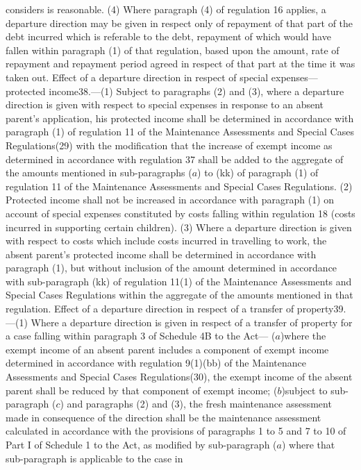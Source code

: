 \documentclass[a4paper]{article}
\begin{document}
considers is reasonable.
(4) Where paragraph (4) of regulation 16 applies, a departure direction may be
given in respect only of repayment of that part of the debt incurred which is
referable to the debt, repayment of which would have fallen within paragraph (1)
of that regulation, based upon the amount, rate of repayment and repayment
period agreed in respect of that part at the time it was taken out.
Effect of a departure direction in respect of special expenses—protected
income38.—(1) Subject to paragraphs (2) and (3), where a departure direction is
given with respect to special expenses in response to an absent parent’s
application, his protected income shall be determined in accordance with
paragraph (1) of regulation 11 of the Maintenance Assessments and Special Cases
Regulations(29) with the modification that the increase of exempt income as
determined in accordance with regulation 37 shall be added to the aggregate of
the amounts mentioned in sub-paragraphs ($a$) to (kk) of paragraph (1) of
regulation 11 of the Maintenance Assessments and Special Cases Regulations.
(2) Protected income shall not be increased in accordance with paragraph (1) on
account of special expenses constituted by costs falling within regulation 18
(costs incurred in supporting certain children).
(3) Where a departure direction is given with respect to costs which include
costs incurred in travelling to work, the absent parent’s protected income shall
be determined in accordance with paragraph (1), but without inclusion of the
amount determined in accordance with sub-paragraph (kk) of regulation 11(1) of
the Maintenance Assessments and Special Cases Regulations within the aggregate
of the amounts mentioned in that regulation.
Effect of a departure direction in respect of a transfer of property39.—(1)
Where a departure direction is given in respect of a transfer of property for a
case falling within paragraph 3 of Schedule 4B to the Act—
($a$)where the exempt income of an absent parent includes a component of exempt
income determined in accordance with regulation 9(1)(bb) of the Maintenance
Assessments and Special Cases Regulations(30), the exempt income of the absent
parent shall be reduced by that component of exempt income;
($b$)subject to sub-paragraph ($c$) and paragraphs (2) and (3), the fresh
maintenance assessment made in consequence of the direction shall be the
maintenance assessment calculated in accordance with the provisions of
paragraphs 1 to 5 and 7 to 10 of Part I of Schedule 1 to the Act, as modified by
sub-paragraph ($a$) where that sub-paragraph is applicable to the case in
\end{document}
